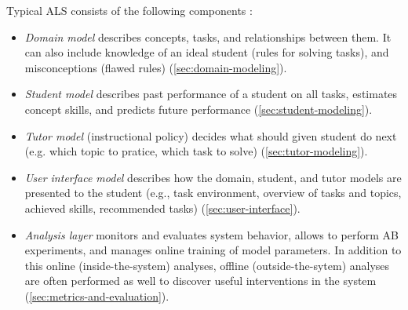 Typical ALS consists of the following components
\cite{its-learner-models}:
\begin{itemize}
\item \emph{Domain model}
  describes concepts, tasks, and relationships between them.
  It can also include knowledge of an ideal student (rules for solving tasks),
  and misconceptions (flawed rules)
  (\cref{sec:domain-modeling}).
\item \emph{Student model} %
  describes past performance of a student on all tasks,
  estimates concept skills,
  and predicts future performance
  (\cref{sec:student-modeling}).
\item \emph{Tutor model}
  (instructional policy)
  decides what should given student do next
  (e.g. which topic to pratice, which task to solve)
  (\cref{sec:tutor-modeling}).
\item \emph{User interface model} %
  describes how the domain, student, and tutor models are presented to
  the student (e.g., task environment, overview of tasks and
  topics, achieved skills, recommended tasks)
  (\cref{sec:user-interface}).
\item \emph{Analysis layer}
  monitors and evaluates system behavior,
  allows to perform AB experiments,
  and manages online training of model parameters.
  In addition to this online (inside-the-system) analyses,
  offline (outside-the-sytem) analyses are often performed as well
  to discover useful interventions in the system  %
  (\cref{sec:metrics-and-evaluation}).
\end{itemize}



